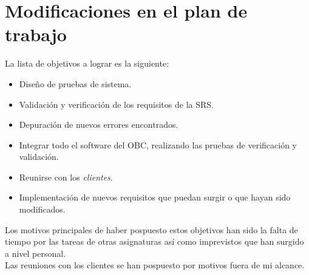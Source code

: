
\section{Modificaciones en el plan de trabajo}
La lista de objetivos a lograr es la siguiente:

\begin{itemize}
\item Diseño de pruebas de sistema.
\item Validación y verificación de los requisitos de la SRS.
\item Depuración de nuevos errores encontrados.
\item Integrar todo el software del OBC, realizando las pruebas de
  verificación y validación.
\item Reunirse con los \textit{clientes}.
\item Implementación de nuevos requisitos que puedan surgir o que hayan sido
  modificados.
\end{itemize}

Los motivos principales de haber pospuesto estos objetivos han sido la falta
de tiempo por las tareas de otras asignaturas así como imprevistos que han
surgido a nivel personal.\\

Las reuniones con los clientes se han pospuesto por motivos fuera de mi alcance.

